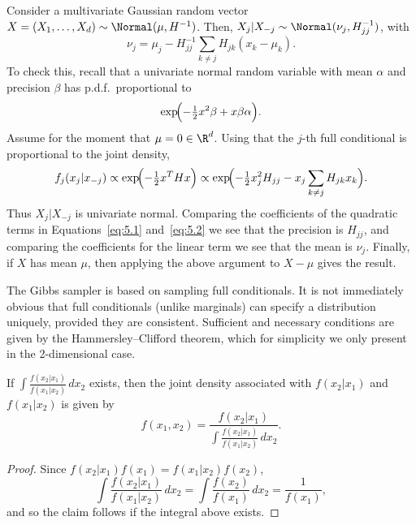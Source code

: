 \begin{example}
\label{ex:5.2}
Consider a multivariate Gaussian random vector $X = (X_1, \ldots, X_d) \sim \Normal(\mu, H^{-1})$.
Then, $X_j | X_{-j} \sim \Normal(\nu_j, H_{jj}^{-1})$, with
\[
  \nu_j = \mu_j - H_{jj}^{-1} \sum_{k \neq j} H_{jk}(x_k - \mu_k).
\]
To check this, recall that a univariate normal random variable with mean $\alpha$ and precision
$\beta$ has p.d.f.\ proportional to
\begin{equation}
  \exp\!\Bigl(-\tfrac{1}{2}x^2\beta + x\beta\alpha\Bigr).
  \label{eq:5.1}
\end{equation}
Assume for the moment that $\mu = 0 \in \R^d$. Using that the $j$-th full conditional is
proportional to the joint density,
\begin{equation}
  f_j(x_j | x_{-j})
  \propto \exp\!\Bigl(-\tfrac{1}{2}x^T H x\Bigr)
  \propto \exp\!\Bigl(-\tfrac{1}{2}x_j^2 H_{jj} - x_j \sum_{k \neq j} H_{jk} x_k\Bigr).
  \label{eq:5.2}
\end{equation}
Thus $X_j | X_{-j}$ is univariate normal. Comparing the coefficients of the quadratic terms in
Equations~\eqref{eq:5.1} and~\eqref{eq:5.2} we see that the precision is $H_{jj}$, and
comparing the coefficients for the linear term we see that the mean is $\nu_j$. Finally, if $X$
has mean $\mu$, then applying the above argument to $X - \mu$ gives the result.
\end{example}

The Gibbs sampler is based on sampling full conditionals. It is not immediately obvious that full
conditionals (unlike marginals) can specify a distribution uniquely, provided they are consistent.
Sufficient and necessary conditions are given by the Hammersley--Clifford theorem, which for
simplicity we only present in the 2-dimensional case.

\begin{theorem}
\label{thm:5.3}
If $\int \frac{f(x_2|x_1)}{f(x_1|x_2)}\,dx_2$ exists, then the joint density associated with
$f(x_2|x_1)$ and $f(x_1|x_2)$ is given by
\[
  f(x_1, x_2) = \frac{f(x_2|x_1)}{\displaystyle\int \frac{f(x_2|x_1)}{f(x_1|x_2)}\,dx_2}.
\]
\end{theorem}

\begin{proof}
Since $f(x_2|x_1)f(x_1) = f(x_1|x_2)f(x_2)$,
\[
  \int \frac{f(x_2|x_1)}{f(x_1|x_2)}\,dx_2
  = \int \frac{f(x_2)}{f(x_1)}\,dx_2
  = \frac{1}{f(x_1)},
\]
and so the claim follows if the integral above exists.
\end{proof}

